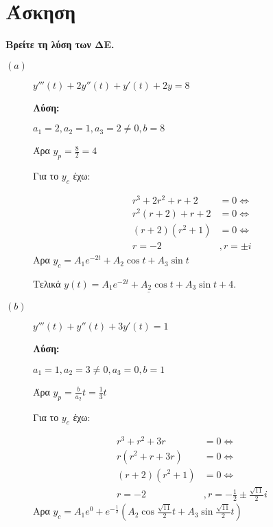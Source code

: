 \documentclass[a4paper,12pt]{article}
\begin{document}
\vspace{2\baselineskip}

\section{Άσκηση}{\bfseries Βρείτε τη λύση των ΔΕ.}

\vspace{2\baselineskip}

\begin{description}

\item [$(a)$] $\boxed{y'''(t)+2y''(t)+y'(t)+2y = 8}$

\textbf{Λύση:}

\vspace{\baselineskip}

$a_1=2, a_2=1, a_3=2\neq 0, b=8$

Άρα $y_p=\frac{8}{2}=4$

Για το $y_c$ έχω:

\begin{align*}
r^3+2r^2+r+2&=0 \Leftrightarrow \\
r^2(r+2)+r+2 &=0 \Leftrightarrow\\
(r+2)(r^2+1)&=0 \Leftrightarrow\\
r=-2 &, r=\pm i
\end{align*}
Αρα $y_c = A_1e^{-2t}+A_2\cos t+A_3\sin t$

Τελικά $\underline{y(t) = A_1e^{-2t}+A_2\cos t+A_3\sin t +4}$.


\vspace{\baselineskip}

\item [$(b)$] $\boxed{y'''(t)+y''(t)+3y'(t) = 1}$

\textbf{Λύση:}

\vspace{\baselineskip}

$a_1=1, a_2=3\neq 0, a_3=0, b=1$

Άρα $y_p=\frac{b}{a_2}t = \frac{1}{3}t$

Για το $y_c$ έχω:

\begin{align*}
r^3+r^2+3r&=0 \Leftrightarrow \\
r(r^2+r+3r) &=0 \Leftrightarrow\\
(r+2)(r^2+1)&=0 \Leftrightarrow\\
r=-2 &, r=-\frac{1}{2}\pm \frac{\sqrt{11}}{2}i
\end{align*}
Αρα $y_c = A_1e^0+e^{-\frac{1}{2}}(A_2\cos\frac{\sqrt{11}}{2}t+A_3\sin\frac{\sqrt{11}}{2}t)$


\end{description}
\end{document}
